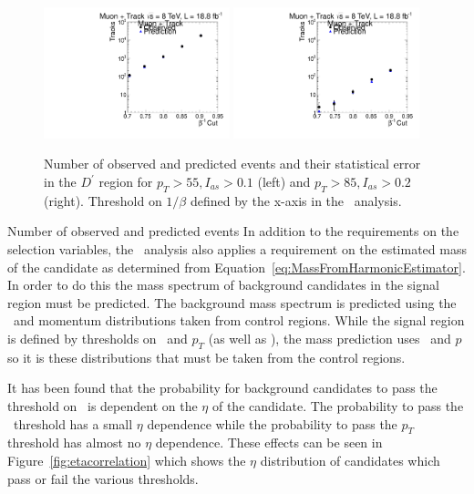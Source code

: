 \begin{figure}
\begin{center}
\includegraphics[clip=false, trim=0.0cm 0cm 0.0cm 0cm, width=0.48\textwidth]{figures/tkmu/Pred_Flip_I010_Pt55_Data8TeV}
\includegraphics[clip=false, trim=0.0cm 0cm 0.0cm 0cm, width=0.48\textwidth]{figures/tkmu/Pred_Flip_I020_Pt85_Data8TeV}
\caption[Number of observed and predicted events in the \invbeta\ $<$ 1 region in the \tktof\ analysis.]
{Number of observed and predicted events and their statistical error in the $D^\prime$ region for $p_T>55, I_{as}>0.1$ (left)
and $p_T>85, I_{as}>0.2$ (right). Threshold on $1/\beta$ defined by the x-axis
in the \tktof\ analysis.}
\label{fig:PredFlipTkTOF}
\end{center}
\end{figure}
Number of observed and predicted events
In addition to the requirements on the selection variables, the \tktof\ analysis also applies a requirement on the estimated mass of the candidate as determined from 
Equation~\ref{eq:MassFromHarmonicEstimator}. In order to do this the mass spectrum of background candidates in the signal region must be predicted.
The background mass spectrum is predicted using the \dedx\ and momentum distributions taken from control regions. While the signal region is defined by thresholds on \ias\ and
$p_T$ (as well as \invbeta), the mass prediction uses \ih\ and $p$ so it is these distributions that must be taken from the control regions. 

It has been found that the probability for background candidates to pass the threshold on \ias\ is dependent on the $\eta$ of the candidate.
The probability to pass the \invbeta\ threshold has a small $\eta$
dependence while the probability to pass the $p_T$ threshold has almost no $\eta$ dependence. These effects can be seen in Figure~\ref{fig:etacorrelation} which shows the $\eta$
distribution of candidates which
pass or fail the various thresholds. 

